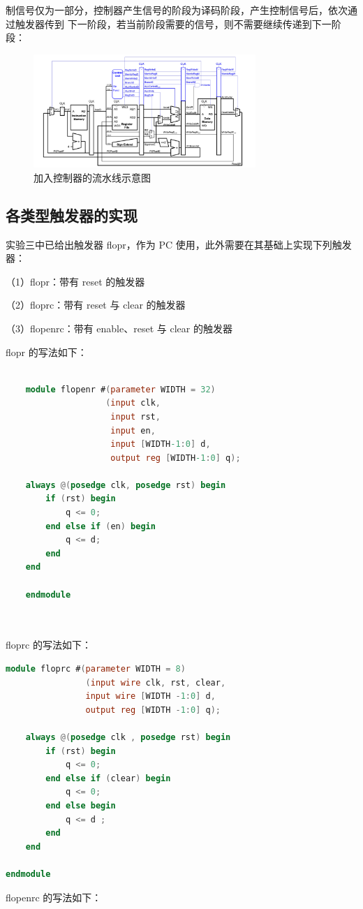 制信号仅为一部分，控制器产生信号的阶段为译码阶段，产生控制信号后，依次通过触发器传到
下一阶段，若当前阶段需要的信号，则不需要继续传递到下一阶段：
\begin{figure}[H]
	\centering
	\includegraphics[width=0.75\textwidth]{figure/加入控制器的流水线示意图.png}
	\caption{加入控制器的流水线示意图}
	\label{fig:pipeline_with_controller}
\end{figure}
\subsection{各类型触发器的实现}
实验三中已给出触发器 flopr，作为 PC 使用，此外需要在其基础上实现下列触发器：

（1）flopr：带有 reset 的触发器

（2）floprc：带有 reset 与 clear 的触发器

（3）flopenrc：带有 enable、reset 与 clear 的触发器

flopr 的写法如下：
\begin{lstlisting}[language=Verilog,caption={flopr实现},label={lst:flopr}]

	module flopenr #(parameter WIDTH = 32)
					(input clk,
					 input rst,
					 input en,
					 input [WIDTH-1:0] d,
					 output reg [WIDTH-1:0] q);
		
	always @(posedge clk, posedge rst) begin
		if (rst) begin
			q <= 0;
		end else if (en) begin
			q <= d;
		end
	end
		
	endmodule
		
	
\end{lstlisting}

floprc 的写法如下：
\begin{lstlisting}[language=Verilog,caption={floprc实现},label={lst:floprc}]
module floprc #(parameter WIDTH = 8)
				(input wire clk, rst, clear,
				input wire [WIDTH -1:0] d,
				output reg [WIDTH -1:0] q);

	always @(posedge clk , posedge rst) begin
		if (rst) begin
			q <= 0;
		end else if (clear) begin
			q <= 0;
		end else begin
			q <= d ;
		end
	end

endmodule

\end{lstlisting}
flopenrc 的写法如下：


